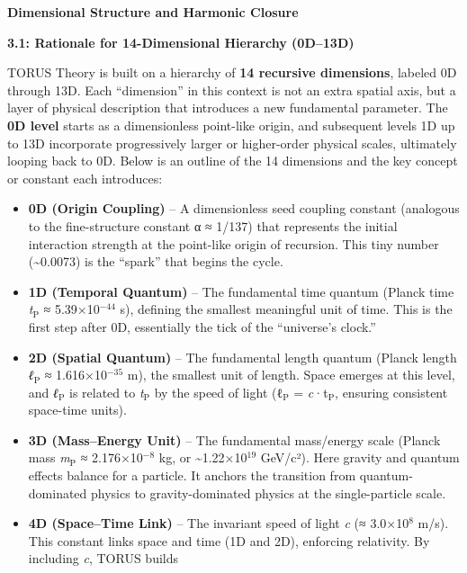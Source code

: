 \documentclass[]{article}
\date{}
\newcommand{\subscript}[1]{\ensuremath{_{\mathrm{#1}}}}
\newcommand{\superscript}[1]{\ensuremath{^{\mathrm{#1}}}}
\begin{document}
\textbf{Dimensional Structure and Harmonic Closure}

\textbf{3.1: Rationale for 14-Dimensional Hierarchy (0D--13D)}

TORUS Theory is built on a hierarchy of \textbf{14 recursive
dimensions}, labeled 0D through 13D. Each ``dimension'' in this context
is not an extra spatial axis, but a layer of physical description that
introduces a new fundamental parameter. The \textbf{0D level} starts as
a dimensionless point-like origin, and subsequent levels 1D up to 13D
incorporate progressively larger or higher-order physical scales,
ultimately looping back to 0D. Below is an outline of the 14 dimensions
and the key concept or constant each introduces:

\begin{itemize}
\item
  \textbf{0D (Origin Coupling)} -- A dimensionless seed coupling
  constant (analogous to the fine-structure constant α ≈ 1/137) that
  represents the initial interaction strength at the point-like origin
  of recursion​. This tiny number (\textasciitilde{}0.0073) is the
  ``spark'' that begins the cycle.
\item
  \textbf{1D (Temporal Quantum)} -- The fundamental time quantum (Planck
  time
  \emph{t\subscript{P}} ≈
  5.39×10\superscript{−44} s), defining the smallest meaningful unit of time. This
  is the first step after 0D, essentially the tick of the ``universe's
  clock.''
\item
  \textbf{2D (Spatial Quantum)} -- The fundamental length quantum
  (Planck length
  \emph{ℓ\subscript{P}} ≈
  1.616×10\superscript{−35} m), the smallest unit of length​. Space emerges at
  this level, and
  \emph{ℓ\subscript{P}} is
  related to
  \emph{t\subscript{P}} by
  the speed of light
  (ℓ\subscript{P} =
  \emph{c}·t\subscript{P},
  ensuring consistent space-time units).
\item
  \textbf{3D (Mass--Energy Unit)} -- The fundamental mass/energy scale
  (Planck mass
  \emph{m\subscript{P}} ≈
  2.176×10\superscript{−8} kg, or \textasciitilde{}1.22×10\superscript{19} GeV/c²)​. Here
  gravity and quantum effects balance for a particle. It anchors the
  transition from quantum-dominated physics to gravity-dominated physics
  at the single-particle scale.
\item
  \textbf{4D (Space--Time Link)} -- The invariant speed of light
  \emph{c} (≈ 3.0×10\superscript{8} m/s)​. This constant links space and time (1D
  and 2D), enforcing relativity. By including \emph{c}, TORUS builds

\end{itemize}
\end{document}
